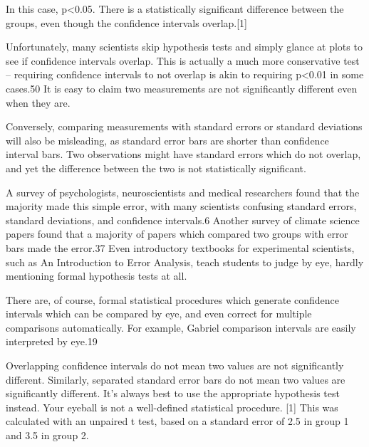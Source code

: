 In this case, p<0.05. There is a statistically significant difference between the groups, even though the confidence intervals overlap.[1]

Unfortunately, many scientists skip hypothesis tests and simply glance at plots to see if confidence intervals overlap. This is actually a much more conservative test – requiring confidence intervals to not overlap is akin to requiring p<0.01 in some cases.50 It is easy to claim two measurements are not significantly different even when they are.

Conversely, comparing measurements with standard errors or standard deviations will also be misleading, as standard error bars are shorter than confidence interval bars. Two observations might have standard errors which do not overlap, and yet the difference between the two is not statistically significant.

A survey of psychologists, neuroscientists and medical researchers found that the majority made this simple error, with many scientists confusing standard errors, standard deviations, and confidence intervals.6 Another survey of climate science papers found that a majority of papers which compared two groups with error bars made the error.37 Even introductory textbooks for experimental scientists, such as An Introduction to Error Analysis, teach students to judge by eye, hardly mentioning formal hypothesis tests at all.

There are, of course, formal statistical procedures which generate confidence intervals which can be compared by eye, and even correct for multiple comparisons automatically. For example, Gabriel comparison intervals are easily interpreted by eye.19

Overlapping confidence intervals do not mean two values are not significantly different. Similarly, separated standard error bars do not mean two values are significantly different. It’s always best to use the appropriate hypothesis test instead. Your eyeball is not a well-defined statistical procedure.
[1]	This was calculated with an unpaired t test, based on a standard error of 2.5 in group 1 and 3.5 in group 2.